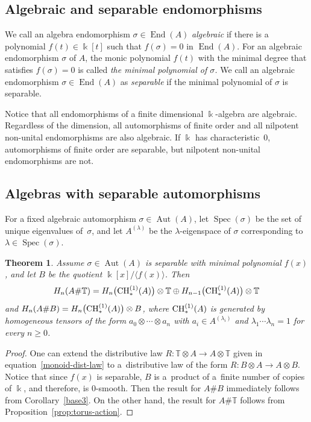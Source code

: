 \documentclass[pdftex]{sigma}
\newcommand{\B}[1]{\mathbb{#1}}
\newcommand{\CH}{{\rm CH}}
\renewcommand{\geq}{\geqslant}
\numberwithin{equation}{section}
\newtheorem{Theorem}{Theorem}[section]
\begin{document}
\subsection{Algebraic and separable endomorphisms}

We call an algebra endomorphism $\sigma\in \operatorname{End}(A)$ \emph{algebraic} if there is a
polynomial $f(t)\in\Bbbk[t]$ such that $f(\sigma) = 0$ in $\operatorname{End}(A)$. For an algebraic
endomorphism $\sigma$ of $A$, the monic polynomial $f(t)$ with the minimal degree that
satisfies $f(\sigma)=0$ is called \emph{the minimal polynomial of $\sigma$.} We call an
algebraic endomorphism $\sigma\in \operatorname{End}(A)$ as \emph{separable} if the minimal polynomial of
$\sigma$ is separable.

Notice that all endomorphisms of a finite dimensional $\Bbbk$-algebra are algebraic.
Regardless of the dimension, all automorphisms of finite order and all nilpotent non-unital
endomorphisms are also algebraic. If $\Bbbk$ has characteristic~0, automorphisms of finite
order are separable, but nilpotent non-unital endomorphisms are not.

\subsection{Algebras with separable automorphisms}\label{sect:separable}

For a fixed algebraic automorphism $\sigma\in \operatorname{Aut}(A)$, let $\operatorname{Spec}(\sigma)$ be the set of
unique eigenvalues of~$\sigma$, and let $A^{(\lambda)}$ be the $\lambda$-eigenspace of
$\sigma$ corresponding to $\lambda \in \operatorname{Spec}(\sigma)$.

\begin{Theorem}\label{thm:separable}
 Assume $\sigma\in \operatorname{Aut}(A)$ is separable with minimal polynomial $f(x)$, and let
 $B$ be the quotient $\Bbbk[x]/\langle f(x)\rangle$. Then
 \[ H_n(A\# \B{T})
 = H_n\bigl(\CH_*^{(1)}(A)\bigr)\otimes\B{T} \oplus H_{n-1}\bigl(\CH_*^{(1)}(A)\bigr)\otimes \B{T}
 \] and
$ H_n(A\# B) = H_n\bigl(\CH_*^{(1)}(A)\bigr)\otimes B$, where $\CH_*^{(1)}(A)$ is generated by homogeneous tensors of the form
$a_0\otimes\cdots\otimes a_n$ with $ a_i\in A^{(\lambda_i)}
$ and $\lambda_1\cdots\lambda_n=1
$ for every $n\geq 0$.
\end{Theorem}

\begin{proof}
 One can extend the distributive law $R\colon \B{T}\otimes A\to A\otimes\B{T}$ given in
 equation~\eqref{monoid-dist-law} to a~distributive law of the form
 $R\colon B\otimes A\to A\otimes B$. Notice that since $f(x)$ is separable, $B$ is a~product of a~finite number of copies of $\Bbbk$, and therefore, is $0$-smooth. Then the result for $A\# B$
 immediately follows from Corollary~\ref{base3}. On the other hand, the result for $A\# \B{T}$
 follows from Proposition~\ref{prop:torus-action}.
\end{proof}
\end{document}

